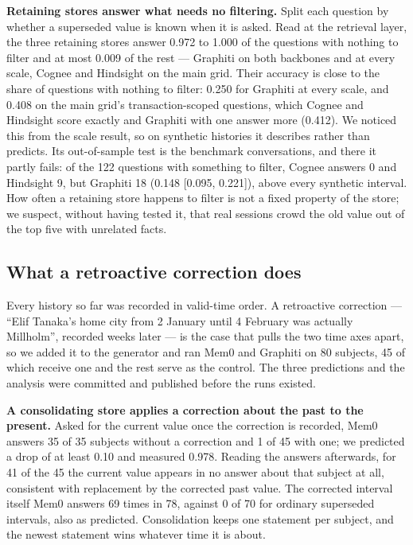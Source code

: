 \documentclass[conference]{IEEEtran}
\begin{document}
\textbf{Retaining stores answer what needs no filtering.} Split each question by
whether a superseded value is known when it is asked. Read at the retrieval
layer, the three retaining stores answer 0.972 to 1.000 of the questions with
nothing to filter and at most 0.009 of the rest --- Graphiti on both backbones
and at every scale, Cognee and Hindsight on the main grid. Their accuracy is close to the share of questions with nothing to
filter: 0.250 for Graphiti at every scale, and 0.408 on the main grid's
transaction-scoped questions, which Cognee and Hindsight score exactly and
Graphiti with one answer more (0.412). We noticed this from the scale result,
so on synthetic histories it describes rather than predicts. Its out-of-sample
test is the benchmark conversations, and there it partly fails: of the 122
questions with something to filter, Cognee answers 0 and Hindsight 9, but
Graphiti 18 (0.148 [0.095, 0.221]), above every synthetic interval. How often a retaining
store happens to filter is not a fixed property of the store; we suspect,
without having tested it, that real sessions crowd the old value out of the top
five with unrelated facts.

\subsection{What a retroactive correction does}\label{sec:corrections}

Every history so far was recorded in valid-time order. A retroactive correction
--- ``Elif Tanaka's home city from 2 January until 4 February was actually
Millholm'',
recorded weeks later --- is the case that pulls the two time axes apart, so we
added it to the generator and ran Mem0 and Graphiti on 80 subjects, 45 of which
receive one and the rest serve as the control. The three predictions and the
analysis were committed and published before the runs existed.

\textbf{A consolidating store applies a correction about the past to the
present.} Asked for the current value once the correction is recorded, Mem0
answers 35 of 35 subjects without a correction and 1 of 45 with one; we
predicted a drop of at least 0.10 and measured 0.978. Reading the answers
afterwards, for 41 of the 45 the current value appears in no answer about that
subject at all, consistent with replacement by the corrected past value. The
corrected interval itself Mem0 answers 69 times in 78, against 0 of 70 for
ordinary superseded intervals, also as predicted. Consolidation keeps one
statement per subject, and the newest statement wins whatever time it is about.
\end{document}
